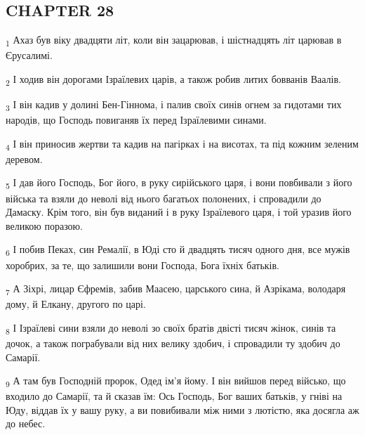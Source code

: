 \subsection{CHAPTER 28}
\begin{tcolorbox}
\textsubscript{1} Ахаз був віку двадцяти літ, коли він зацарював, і шістнадцять літ царював в Єрусалимі.
\end{tcolorbox}
\begin{tcolorbox}
\textsubscript{2} І ходив він дорогами Ізраїлевих царів, а також робив литих бовванів Ваалів.
\end{tcolorbox}
\begin{tcolorbox}
\textsubscript{3} І він кадив у долині Бен-Гіннома, і палив своїх синів огнем за гидотами тих народів, що Господь повиганяв їх перед Ізраїлевими синами.
\end{tcolorbox}
\begin{tcolorbox}
\textsubscript{4} І він приносив жертви та кадив на пагірках і на висотах, та під кожним зеленим деревом.
\end{tcolorbox}
\begin{tcolorbox}
\textsubscript{5} І дав його Господь, Бог його, в руку сирійського царя, і вони повбивали з його війська та взяли до неволі від нього багатьох полонених, і спровадили до Дамаску. Крім того, він був виданий і в руку Ізраїлевого царя, і той уразив його великою поразою.
\end{tcolorbox}
\begin{tcolorbox}
\textsubscript{6} І побив Пеках, син Ремалії, в Юді сто й двадцять тисяч одного дня, все мужів хоробрих, за те, що залишили вони Господа, Бога їхніх батьків.
\end{tcolorbox}
\begin{tcolorbox}
\textsubscript{7} А Зіхрі, лицар Єфремів, забив Маасею, царського сина, й Азрікама, володаря дому, й Елкану, другого по царі.
\end{tcolorbox}
\begin{tcolorbox}
\textsubscript{8} І Ізраїлеві сини взяли до неволі зо своїх братів двісті тисяч жінок, синів та дочок, а також пограбували від них велику здобич, і спровадили ту здобич до Самарії.
\end{tcolorbox}
\begin{tcolorbox}
\textsubscript{9} А там був Господній пророк, Одед ім'я йому. І він вийшов перед військо, що входило до Самарії, та й сказав їм: Ось Господь, Бог ваших батьків, у гніві на Юду, віддав їх у вашу руку, а ви повибивали між ними з лютістю, яка досягла аж до небес.
\end{tcolorbox}
